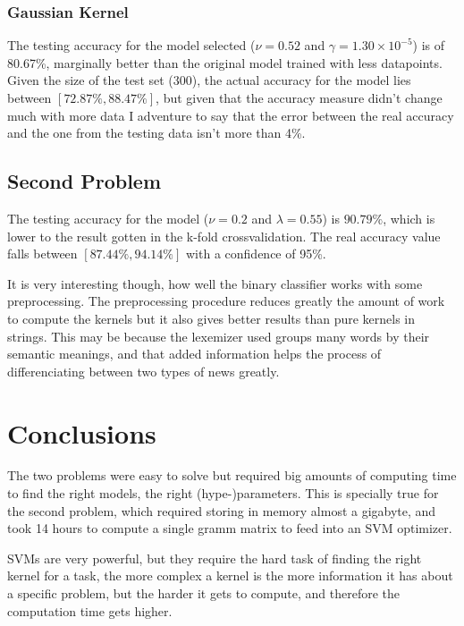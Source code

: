 \documentclass[format=acmtog]{acmart}
\begin{document}
\subsubsection{Gaussian Kernel}\label{gaussian-kernel}

The testing accuracy for the model selected (\(\nu = 0.52\) and
\(\gamma = 1.30 \times 10^{-5}\)) is of 80.67\%, marginally better than
the original model trained with less datapoints. Given the size of the
test set (300), the actual accuracy for the model lies between
\([ 72.87\%, 88.47\%]\), but given that the accuracy measure didn't
change much with more data I adventure to say that the error between the
real accuracy and the one from the testing data isn't more than 4\%.

\subsection{Second Problem}\label{second-problem-2}

The testing accuracy for the model (\(\nu = 0.2\) and
\(\lambda = 0.55\)) is \(90.79\%\), which is lower to the result gotten
in the k-fold crossvalidation. The real accuracy value falls between
\([87.44\%, 94.14\%]\) with a confidence of 95\%.

It is very interesting though, how well the binary classifier works with
some preprocessing. The preprocessing procedure reduces greatly the
amount of work to compute the kernels but it also gives better results
than pure kernels in strings. This may be because the lexemizer used
groups many words by their semantic meanings, and that added information
helps the process of differenciating between two types of news greatly.

\section{Conclusions}\label{conclusions}

The two problems were easy to solve but required big amounts of
computing time to find the right models, the right (hype-)parameters.
This is specially true for the second problem, which required storing in
memory almost a gigabyte, and took 14 hours to compute a single gramm
matrix to feed into an SVM optimizer.

SVMs are very powerful, but they require the hard task of finding the
right kernel for a task, the more complex a kernel is the more
information it has about a specific problem, but the harder it gets to
compute, and therefore the computation time gets higher.
\end{document}
